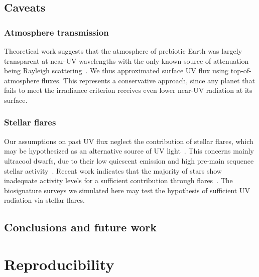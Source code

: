 \documentclass[modern,linenumbers]{aastex631}
\begin{document}
\subsection{Caveats}
\subsubsection{Atmosphere transmission}
Theoretical work suggests that the atmosphere of prebiotic Earth was largely transparent at near-UV wavelengths with the only known source of attenuation being Rayleigh scattering~\citep{Ranjan2017,Ranjan2017c}.
We thus approximated surface UV flux using top-of-atmosphere fluxes.
This represents a conservative approach, since any planet that fails to meet the irradiance criterion receives even lower near-UV radiation at its surface. 

\subsubsection{Stellar flares}
Our assumptions on past UV flux neglect the contribution of stellar flares, which may be hypothesized as an alternative source of UV light~\citep{Ranjan2017}.
This concerns mainly ultracool dwarfs, due to their low quiescent emission and high pre-main sequence stellar activity~\citep{Buccino2007,West2008}.
Recent work indicates that the majority of stars show inadequate activity levels for a sufficient contribution through flares~\citep{Glazier2020,Ducrot2020,Guenther2020}.
The biosignature surveys we simulated here may test the hypothesis of sufficient UV radiation via stellar flares.




\subsection{Conclusions and future work}

%

\section*{Reproducibility}


\end{document}
